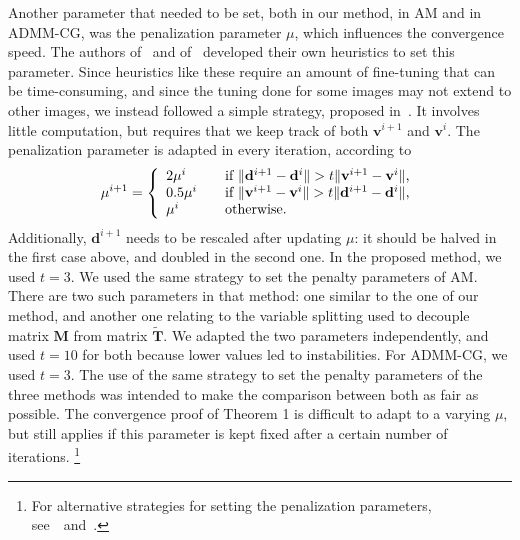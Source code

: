 \documentclass[10pt,twocolumn,twoside]{IEEEtran}
\newcommand{\vs}{\mathbf{v}} %
\newcommand{\dv}{\mathbf{d}} %
\newcommand{\M}{\mathbf{M}} %
\newcommand{\T}{\mathbf{T}} %
\begin{document}
Another parameter that needed to be set, both in our method, in AM and in ADMM-CG, was the penalization parameter $\mu$, which influences the convergence speed. The authors of~\cite{Almeida2013a} and of~\cite{Matakos2013} developed their own heuristics to set this parameter. Since heuristics like these require an amount of fine-tuning that can be time-consuming, and since the tuning done for some images may not extend to other images, we instead followed a simple strategy, proposed in~\cite{Boyd2011}. It involves little computation, but requires that we keep track of both $\vs^{i+1}$ and $\vs^i$. The penalization parameter is adapted in every iteration, according to
\begin{equation} \label{eq:varying_penalty}
	\mu^{i+1} = \left\{
	\begin{array}{l l}
		2\mu^i & \quad \text{if $\| \dv^{i+1} - \dv^i \| > t \| \vs^{i+1} - \vs^i \|$,}\\
		0.5\mu^i & \quad \text{if $\| \vs^{i+1} - \vs^i \| > t \| \dv^{i+1} - \dv^i \|$,}\\
		\mu^i & \quad \text{otherwise.}
	\end{array} \right.
\end{equation}
Additionally, $\dv^{i+1}$ needs to be rescaled after updating $\mu$: it should be halved in the first case above, and doubled in the second one. In the proposed method, we used $t=3$. We used the same strategy to set the penalty parameters of AM. There are two such parameters in that method: one similar to the one of our method, and another one relating to the variable splitting used to decouple matrix $\M$ from matrix $\tilde{\T}$. We adapted the two parameters independently, and used $t=10$ for both because lower values led to instabilities. For ADMM-CG, we used $t=3$. The use of the same strategy to set the penalty parameters of the three methods was intended to make the comparison between both as fair as possible. The convergence proof of Theorem 1 is difficult to adapt to a varying $\mu$, but still applies if this parameter is kept fixed after a certain number of iterations. \footnote{For alternative strategies for setting the penalization parameters, see~\mbox{\cite{Boyd2011} and \cite{He2000}}.}
\end{document}
